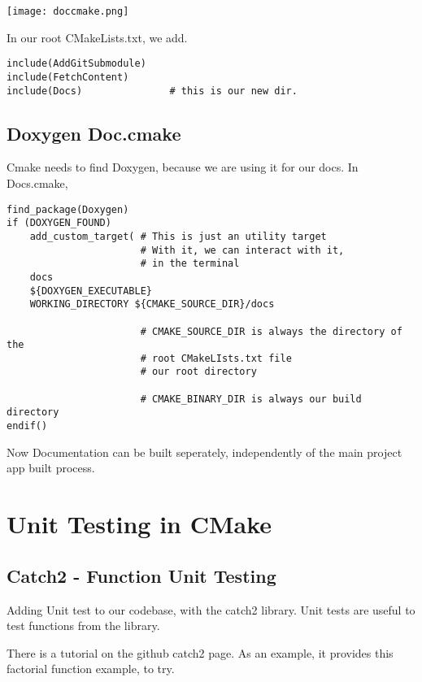 \begin{center}
    \texttt{[image: doccmake.png]}
\end{center}

In our root CMakeLists.txt, we add.

\begin{verbatim}
include(AddGitSubmodule)
include(FetchContent)
include(Docs)               # this is our new dir.

\end{verbatim}


\subsection{Doxygen Doc.cmake}

Cmake needs to find Doxygen, because we are using it for our docs. In Docs.cmake,

\begin{verbatim}
find_package(Doxygen)
if (DOXYGEN_FOUND)
    add_custom_target( # This is just an utility target
                       # With it, we can interact with it, 
                       # in the terminal
    docs
    ${DOXYGEN_EXECUTABLE}
    WORKING_DIRECTORY ${CMAKE_SOURCE_DIR}/docs

                       # CMAKE_SOURCE_DIR is always the directory of the
                       # root CMakeLIsts.txt file
                       # our root directory

                       # CMAKE_BINARY_DIR is always our build directory
endif()
\end{verbatim}

Now Documentation can be built seperately, independently of the main project app built process.

\section{Unit Testing in CMake}

\subsection{Catch2 - Function Unit Testing}

Adding Unit test to our codebase, with the catch2 library. Unit tests are useful to test functions from the library.

There is a tutorial on the github catch2 page. As an example, it provides this factorial function example, to try.

